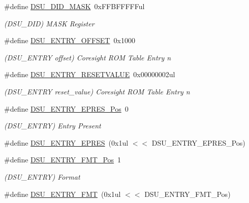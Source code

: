 \begin{DoxyCompactItemize}
\item 
\#define \mbox{\hyperlink{group___s_a_m_d21___d_s_u_gac1403dba443577379c24df9d1bff8cb1}{D\+S\+U\+\_\+\+D\+I\+D\+\_\+\+M\+A\+SK}}~0x\+F\+F\+B\+F\+F\+F\+F\+Ful
\begin{DoxyCompactList}\small\item\em (D\+S\+U\+\_\+\+D\+ID) M\+A\+SK Register \end{DoxyCompactList}\item 
\#define \mbox{\hyperlink{group___s_a_m_d21___d_s_u_gabf579a43c4cd13d6c94af6656ad564fd}{D\+S\+U\+\_\+\+E\+N\+T\+R\+Y\+\_\+\+O\+F\+F\+S\+ET}}~0x1000
\begin{DoxyCompactList}\small\item\em (D\+S\+U\+\_\+\+E\+N\+T\+RY offset) Coresight R\+OM Table Entry n \end{DoxyCompactList}\item 
\#define \mbox{\hyperlink{group___s_a_m_d21___d_s_u_gac085c78a25a715450028693587be6f33}{D\+S\+U\+\_\+\+E\+N\+T\+R\+Y\+\_\+\+R\+E\+S\+E\+T\+V\+A\+L\+UE}}~0x00000002ul
\begin{DoxyCompactList}\small\item\em (D\+S\+U\+\_\+\+E\+N\+T\+RY reset\+\_\+value) Coresight R\+OM Table Entry n \end{DoxyCompactList}\item 
\#define \mbox{\hyperlink{group___s_a_m_d21___d_s_u_ga17db89e8a7cdd4950fb0f754cdf91c9e}{D\+S\+U\+\_\+\+E\+N\+T\+R\+Y\+\_\+\+E\+P\+R\+E\+S\+\_\+\+Pos}}~0
\begin{DoxyCompactList}\small\item\em (D\+S\+U\+\_\+\+E\+N\+T\+RY) Entry Present \end{DoxyCompactList}\item 
\#define \mbox{\hyperlink{group___s_a_m_d21___d_s_u_gaf9d14d3c1085ee9a8ddc2e7c0f4e2c1d}{D\+S\+U\+\_\+\+E\+N\+T\+R\+Y\+\_\+\+E\+P\+R\+ES}}~(0x1ul $<$$<$ D\+S\+U\+\_\+\+E\+N\+T\+R\+Y\+\_\+\+E\+P\+R\+E\+S\+\_\+\+Pos)
\item 
\#define \mbox{\hyperlink{group___s_a_m_d21___d_s_u_ga64b5a6e8e4e1cb7c47f263c9ec0c0eb0}{D\+S\+U\+\_\+\+E\+N\+T\+R\+Y\+\_\+\+F\+M\+T\+\_\+\+Pos}}~1
\begin{DoxyCompactList}\small\item\em (D\+S\+U\+\_\+\+E\+N\+T\+RY) Format \end{DoxyCompactList}\item 
\#define \mbox{\hyperlink{group___s_a_m_d21___d_s_u_ga4cd9b410d66436af77429ab7c66fe798}{D\+S\+U\+\_\+\+E\+N\+T\+R\+Y\+\_\+\+F\+MT}}~(0x1ul $<$$<$ D\+S\+U\+\_\+\+E\+N\+T\+R\+Y\+\_\+\+F\+M\+T\+\_\+\+Pos)

\end{DoxyCompactItemize}

